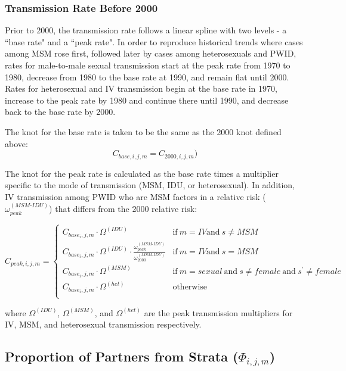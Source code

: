 \documentclass{article}
\begin{document}
\subsubsection{Transmission Rate Before 2000}

Prior to 2000, the transmission rate follows a linear spline with two levels - a ``base rate" and a ``peak rate". In order to reproduce historical trends where cases among MSM rose first, followed later by cases among heterosexuals and PWID, rates for male-to-male sexual transmission start at the peak rate from 1970 to 1980, decrease from 1980 to the base rate at 1990, and remain flat until 2000. Rates for heterosexual and IV transmission begin at the base rate in 1970, increase to the peak rate by 1980 and continue there until 1990, and decrease back to the base rate by 2000.

The knot for the base rate is taken to be the same as the 2000 knot defined above:
\begin{equation}
C_{base,i,j,m} = C_{2000,i,j,m})
\end{equation}

The knot for the peak rate is calculated as the base rate times a multiplier specific to the mode of transmission (MSM, IDU, or heterosexual). In addition, IV transmission among PWID who are MSM factors in a relative risk ($\omega^{(MSM\text{-}IDU)}_{peak}$) that differs from the 2000 relative risk:

\begin{equation}
C_{peak,i,j,m} = \begin{cases}
C_{base_i,j,m} \cdot \Omega^{(IDU)} & \text{if}\ m=IV \text{and}\ s\neq MSM \\
C_{base_i,j,m} \cdot \Omega^{(IDU)} \cdot \frac{\omega^{(MSM\text{-}IDU)}_{peak}}{\omega^{(MSM\text{-}IDU)}_{2000}} & \text{if}\ m=IV \text{and}\ s=MSM\\
C_{base_i,j,m} \cdot \Omega^{(MSM)}  & \text{if}\ m=sexual\ \text{and}\ s\neq female\ \text{and}\ s^\prime\neq female\\
C_{base_i,j,m} \cdot \Omega^{(het)} & \text{otherwise}\\
\end{cases}
\end{equation}

where $\Omega^{(IDU)}$, $\Omega^{(MSM)}$, and $\Omega^{(het)}$ are the peak transmission multipliers for IV, MSM, and heterosexual transmission respectively.


\subsection{Proportion of Partners from Strata \big($\Phi_{i,j,m}$\big)}
\end{document}
